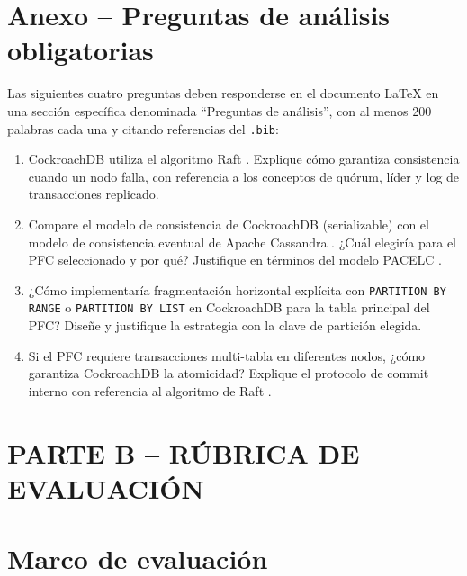 \documentclass[11pt,a4paper]{article}
\begin{document}
\section{Anexo -- Preguntas de an\'alisis obligatorias}

Las siguientes cuatro preguntas deben responderse en el documento LaTeX en una secci\'on espec\'ifica denominada ``Preguntas de an\'alisis'', con al menos 200 palabras cada una y citando referencias del \texttt{.bib}:

\begin{enumerate}[leftmargin=1.6em]
    \item CockroachDB utiliza el algoritmo Raft \parencite{OngaroOusterhout2014Raft}. Explique c\'omo garantiza consistencia cuando un nodo falla, con referencia a los conceptos de qu\'orum, l\'ider y log de transacciones replicado.
    \item Compare el modelo de consistencia de CockroachDB (serializable) \parencite{Taft2020CockroachDB} con el modelo de consistencia eventual de Apache Cassandra \parencite{DeCandia2007Dynamo}. ¿Cu\'al elegir\'ia para el PFC seleccionado y por qu\'e? Justifique en t\'erminos del modelo PACELC \parencite{Abadi2012PACELC}.
    \item ¿C\'omo implementar\'ia fragmentaci\'on horizontal expl\'icita con \texttt{PARTITION BY RANGE} o \texttt{PARTITION BY LIST} en CockroachDB para la tabla principal del PFC? Dise\~ne y justifique la estrategia con la clave de partici\'on elegida.
    \item Si el PFC requiere transacciones multi-tabla en diferentes nodos, ¿c\'omo garantiza CockroachDB la atomicidad? Explique el protocolo de commit interno con referencia al algoritmo de Raft \parencite{OngaroOusterhout2014Raft,Taft2020CockroachDB}.
\end{enumerate}

\newpage
\section*{PARTE B -- R\'UBRICA DE EVALUACI\'ON}

\section{Marco de evaluaci\'on}
\end{document}
